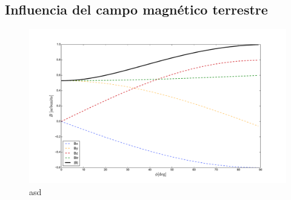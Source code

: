 	
	
% 	
% 	
% 	
	
	\subsection{Influencia del campo magn\'etico terrestre}
	
	\begin{figure}[ht!]
		\centering
		\includegraphics[width=\textwidth]{./fig/EASRadio/geomComps_Malarge}
		\caption{\label{fig:geomComps_Malarge}
		asd
		}
	\end{figure}
	
